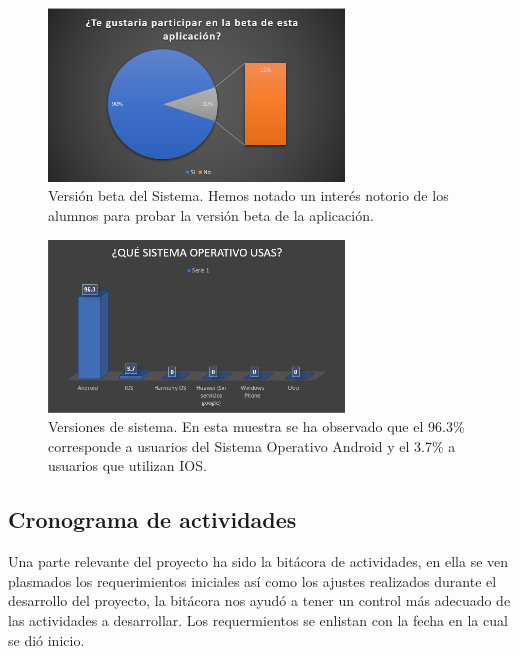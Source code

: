 \documentclass[10pt]{article}
\begin{document}
\par\vspace{\baselineskip}
\begin{figure}[H]
    \begin{center}
    \includegraphics[width=0.7\textwidth]{Imagenes/7.PNG}
    \caption{Versión beta del Sistema. Hemos notado un interés notorio de los alumnos para probar la versión beta de la aplicación. }
\label{fig1}
    \end{center}
\end{figure} 
\par\vspace{\baselineskip}
\begin{figure}[H]
    \begin{center}
    \includegraphics[width=0.7\textwidth]{Imagenes/8.PNG}
    \caption{Versiones de sistema. En esta muestra se ha observado que el 96.3\% corresponde a usuarios del Sistema Operativo Android y el 3.7\% a usuarios que utilizan IOS. }
\label{fig1}
    \end{center}
\end{figure} 

\subsection{Cronograma de actividades}
\justify
Una parte relevante del proyecto ha sido la bitácora de actividades, en ella se ven plasmados los requerimientos iniciales así como los ajustes realizados durante el desarrollo del proyecto, la bitácora nos ayudó a tener un control más adecuado de las actividades a desarrollar. Los requermientos se enlistan con la fecha en la cual se dió inicio.
\end{document}
